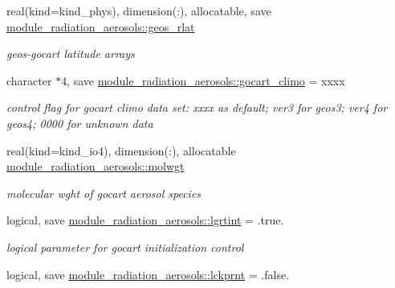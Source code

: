 \begin{DoxyCompactItemize}
real(kind=kind\+\_\+phys), dimension(\+:), allocatable, save \hyperlink{group__module__radiation__aerosols_gaef43bfbd28ef9b87e8d6973ba7331a18}{module\+\_\+radiation\+\_\+aerosols\+::geos\+\_\+rlat}
\begin{DoxyCompactList}\small\item\em geos-\/gocart latitude arrays \end{DoxyCompactList}\item 
\mbox{\label{group__module__radiation__aerosols_gab8118108e60a4795a8caa5af71232399}} 
character $\ast$4, save \hyperlink{group__module__radiation__aerosols_gab8118108e60a4795a8caa5af71232399}{module\+\_\+radiation\+\_\+aerosols\+::gocart\+\_\+climo} = \textquotesingle{}xxxx\textquotesingle{}
\begin{DoxyCompactList}\small\item\em control flag for gocart climo data set\+: xxxx as default; ver3 for geos3; ver4 for geos4; 0000 for unknown data \end{DoxyCompactList}\item 
\mbox{\label{group__module__radiation__aerosols_ga166e63abaa518ec795f8eea6d115f03c}} 
real(kind=kind\+\_\+io4), dimension(\+:), allocatable \hyperlink{group__module__radiation__aerosols_ga166e63abaa518ec795f8eea6d115f03c}{module\+\_\+radiation\+\_\+aerosols\+::molwgt}
\begin{DoxyCompactList}\small\item\em molecular wght of gocart aerosol species \end{DoxyCompactList}\item 
\mbox{\label{group__module__radiation__aerosols_gaa27bf6912bfd67b78381892d4f555c51}} 
logical, save \hyperlink{group__module__radiation__aerosols_gaa27bf6912bfd67b78381892d4f555c51}{module\+\_\+radiation\+\_\+aerosols\+::lgrtint} = .true.
\begin{DoxyCompactList}\small\item\em logical parameter for gocart initialization control \end{DoxyCompactList}\item 
\mbox{\label{group__module__radiation__aerosols_ga018d5414597049069c1ddd1094285371}} 
logical, save \hyperlink{group__module__radiation__aerosols_ga018d5414597049069c1ddd1094285371}{module\+\_\+radiation\+\_\+aerosols\+::lckprnt} = .false.

\end{DoxyCompactItemize}
